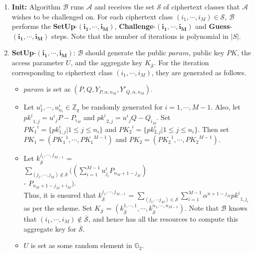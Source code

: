 \begin{enumerate}
 
 \item \textbf{Init:} Algorithm $\mathcal{B}$ runs $\mathcal{A}$ and receives the set $\mathcal{S}$ of ciphertext classes that $\mathcal{A}$ wishes to be challenged on. For each ciphertext class $(i_1,\cdots,i_M)\in\mathcal{S}$, $\mathcal{B}$ performs the \textbf{SetUp}-$\mathbf{(i_1,\cdots,i_M)}$, \textbf{Challenge}-$\mathbf{(i_1,\cdots,i_M)}$ and \textbf{Guess}-$\mathbf{(i_1,\cdots,i_M)}$ steps. Note that the number of iterations is polynomial in $|S|$. 
 
 \item \textbf{SetUp}-$\mathbf{(i_1,\cdots,i_M)}$: $\mathcal{B}$ should generate the public $param$, public key $PK$, the access parameter $U$, and the aggregate key $K_{\overline{\mathcal{S}}}$. For the iteration corresponding to ciphertext class $(i_1,\cdots,i_M)$, they are generated as follows.
 \begin{itemize}
  \item $param$ is set as $(P,Q,Y_{P,\alpha,n_M},Y'_{Q,\alpha,n_M})$.
  \item Let $u^{i}_1,\cdots,u^{i}_{n_i} \in \mathbb{Z}_q$ be randomly generated for $i=1,\cdots,M-1$. Also, let ${pk^{i}}_{1,j}={u^{i}}_jP-P_{i_M}$ and ${pk^{i}}_{2,j}={u^{i}}_jQ-Q_{i_M}$. Set ${PK_1}^{i}=\{pk^{i}_{1,j}|1\leq j \leq n_i\}$ and ${PK_2}^{i}=\{pk^{i}_{2,j}|1\leq j \leq n_i\}$. Then set $PK_1=({PK_1}^{1},\cdots,{PK_1}^{M-1})$ and $PK_2=({PK_2}^{1},\cdots,{PK_2}^{M-1})$. 
  \item Let $k^{j_1,\cdots,j_{M-1}}_{\overline{\mathcal{S}}}$ = \\$\sum_{(j_1,\cdots,j_M)\notin\mathcal{S}}((\sum_{i=1}^{M-1}u^{i}_{j_i}P_{n_M+1-j_M})$\\ - $P_{n_M+1-j_M+i_M})$.\\ Thus, it is ensured that $k^{j_1,\cdots,j_{M-1}}_{\overline{\mathcal{S}}}$ = $\sum_{(j_1,\cdots j_M)\in\mathcal{S}}\sum_{i=1}^{M-1}\alpha^{n+1-j_M}{pk^{i}}_{1,j_i}$ as per the scheme. Set $K_{\overline{\mathcal{S}}}$ = $(k^{1,\cdots,1}_{\overline{\mathcal{S}}},\cdots,k^{n_1,\cdots,n_{M-1}}_{\overline{\mathcal{S}}})$. Note that $\mathcal{B}$ knows that $(i_1,\cdots,i_M)\notin \overline{\mathcal{S}}$, and hence has all the resources to compute this aggregate key for $\overline{\mathcal{S}}$.   
  \item $U$ is set as some random element in $\mathbb{G}_2$.
 \end{itemize}
 

\end{enumerate}
